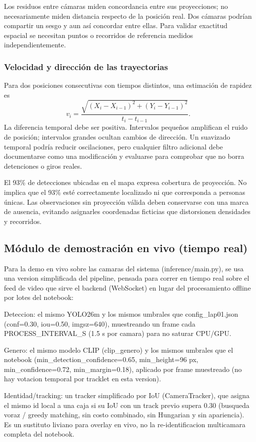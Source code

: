 \documentclass[12pt,letterpaper]{article}
\begin{document}
Los residuos entre cámaras miden concordancia entre sus proyecciones; no necesariamente miden distancia respecto de la posición real. Dos cámaras podrían compartir un sesgo y aun así concordar entre ellas. Para validar exactitud espacial se necesitan puntos o recorridos de referencia medidos independientemente.

\subsubsection{Velocidad y dirección de las trayectorias}
Para dos posiciones consecutivas con tiempos distintos, una estimación de rapidez es
\[
 v_i=\frac{\sqrt{(X_i-X_{i-1})^2+(Y_i-Y_{i-1})^2}}
 {t_i-t_{i-1}}.
\]
La diferencia temporal debe ser positiva. Intervalos pequeños amplifican el ruido de posición; intervalos grandes ocultan cambios de dirección. Un suavizado temporal podría reducir oscilaciones, pero cualquier filtro adicional debe documentarse como una modificación y evaluarse para comprobar que no borra detenciones o giros reales.

El 93\% de detecciones ubicadas en el mapa expresa cobertura de proyección. No implica que el 93\% esté correctamente localizado ni que corresponda a personas únicas. Las observaciones sin proyección válida deben conservarse con una marca de ausencia, evitando asignarles coordenadas ficticias que distorsionen densidades y recorridos.


\subsection{Módulo de demostración en vivo (tiempo real)}

Para la demo en vivo sobre las camaras del sistema (inference/main.py), se usa una version simplificada del pipeline, pensada para correr en tiempo real sobre el feed de video que sirve el backend (WebSocket) en lugar del procesamiento offline por lotes del notebook:


Deteccion: el mismo YOLO26m y los mismos umbrales que config\_lap01.json (conf=0.30, iou=0.50, imgsz=640), muestreando un frame cada PROCESS\_INTERVAL\_S (1.5 s por camara) para no saturar CPU/GPU.


Genero: el mismo modelo CLIP (clip\_genero) y los mismos umbrales que el notebook (min\_detection\_confidence=0.65, min\_height=96 px, min\_confidence=0.72, min\_margin=0.18), aplicado por frame muestreado (no hay votacion temporal por tracklet en esta version).


Identidad/tracking: un tracker simplificado por IoU (CameraTracker), que asigna el mismo id local a una caja si su IoU con un track previo supera 0.30 (busqueda voraz / greedy matching, sin costo combinado, sin Hungarian y sin apariencia). Es un sustituto liviano para overlay en vivo, no la re-identificacion multicamara completa del notebook.
\end{document}
